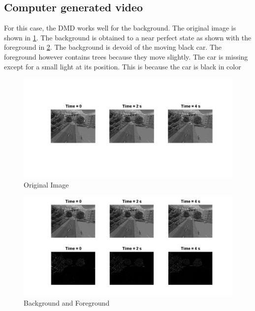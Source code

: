 \documentclass[a4paper]{article}
\begin{document}
\subsection{Computer generated video}

For this case, the DMD works well for the background. The original image is shown in \ref{F:Im222}. The background is obtained to a near perfect state as shown with the foreground in \ref{F:Im22}. The background is devoid of the moving black car. The foreground however contains trees because they move slightly. The car is missing except for a small light at its position. This is because the car is black in color


\begin{figure}[h] 
	\begin{centering} 
		\includegraphics[width=1.1\textwidth]{Im222}
	\end{centering}
	\caption{Original Image \label{F:Im222}}	
\end{figure}

\begin{figure}[h!] 
	\begin{centering} 
		\includegraphics[width=1.1\textwidth]{Image22}
	\end{centering}
	\caption{Background and Foreground \label{F:Im22}}	
\end{figure}
\end{document}
